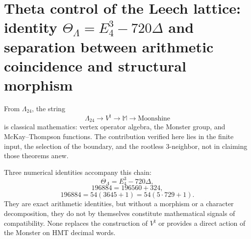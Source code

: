 \section{Theta control of the Leech lattice: identity \texorpdfstring{\(\Theta_{\Lambda}=E_4^3-720\Delta\)}{Theta Lambda = E4^3 - 720 Delta} and separation between arithmetic coincidence and structural morphism}
\label{sec:control-theta-leech}

From \(\Lambda_{24}\), the string
\[
\Lambda_{24}
\longrightarrow V^\natural
\longrightarrow\mathbb M
\longrightarrow\text{Moonshine}
\]
is classical mathematics: vertex operator algebra, the Monster group, and
McKay--Thompson functions. The contribution verified here lies in the finite
input, the selection of the boundary, and the rootless \(3\)-neighbor, not in claiming
those theorems anew.

Three numerical identities accompany this chain:
\[
\Theta_{\Lambda}=E_4^3-720\Delta,
\]
\[
196884=196560+324,
\]
\[
196884=54(3645+1)=54(5\cdot729+1).
\]
They are exact arithmetic identities, but without a morphism or a character
decomposition, they do not by themselves constitute mathematical signals of
compatibility. None replaces the construction of \(V^\natural\) or
provides a direct action of the Monster on HMT decimal words.
